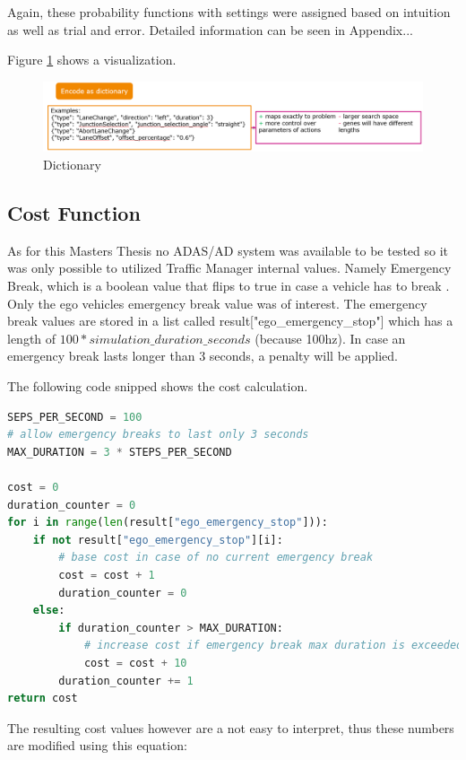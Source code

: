Again, these probability functions with settings were assigned based on intuition as well as trial and error. Detailed information can be seen in Appendix...

Figure \ref{figure:encoding:gene:dict} shows a visualization.

\begin{figure}[ht] 
	\includegraphics[width=1\linewidth]{figures/dict_encoding}
	\caption{Dictionary}
	\label{figure:encoding:gene:dict}
\end{figure}

\subsection{Cost Function}
\label{implementation:cost_function}
As for this Masters Thesis no ADAS/AD system was available to be tested so it was only possible to utilized Traffic Manager internal values. Namely Emergency Break, which is a boolean value that flips to true in case a vehicle has to break . Only the ego vehicles emergency break value was of interest. The emergency break values are stored in a list called result["ego\_emergency\_stop"] which has a length of $100 * simulation\_duration\_seconds$ (because 100hz). In case an emergency break lasts longer than 3 seconds, a penalty will be applied.

The following code snipped shows the cost calculation.
\begin{lstlisting}[language=Python, tabsize=4]
SEPS_PER_SECOND = 100
# allow emergency breaks to last only 3 seconds
MAX_DURATION = 3 * STEPS_PER_SECOND

cost = 0
duration_counter = 0
for i in range(len(result["ego_emergency_stop"])):
	if not result["ego_emergency_stop"][i]:
		# base cost in case of no current emergency break
		cost = cost + 1
		duration_counter = 0
	else:
		if duration_counter > MAX_DURATION:
			# increase cost if emergency break max duration is exceeded
			cost = cost + 10
		duration_counter += 1
return cost
\end{lstlisting}

The resulting cost values however are a not easy to interpret, thus these numbers are modified using this equation:

